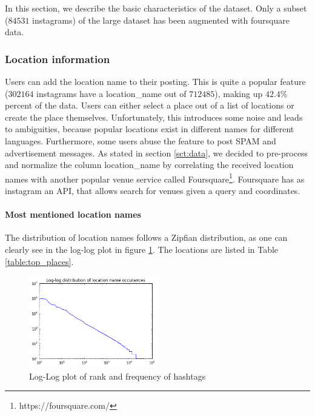 In this section, we describe the basic characteristics of the dataset. Only a subset ($84531$ instagrams) of the large dataset has been augmented with foursquare data.

\subsubsection{Location information}

Users can add the location name to their posting. This is quite a popular feature ($302164$ instagrams have a location\_name out of $712485$), making up $42.4\%$ percent of the data. Users can either select a place out of a list of locations or create the place themselves. Unfortunately, this introduces some noise and leads to ambiguities, because popular locations exist in different names for different languages. Furthermore, some users abuse the feature to post SPAM and advertisement messages. As stated in section \ref{sct:data}, we decided to pre-process and normalize the column location\_name by correlating the received location names with another popular venue service called Foursquare\footnote{https://foursquare.com/}. Foursquare has as instagram an API, that allows search for venues given a query and coordinates.

\paragraph{Most mentioned location names}

The distribution of location names follows a Zipfian distribution, as one can clearly see in the log-log plot in figure \ref{fig:location_name_log_log}. The locations are listed in Table \ref{table:top_places}.

\begin{figure}[h!]
  \centering
    \includegraphics[width=0.5\textwidth]{images/location_name_distribution_log_log}
  \caption{Log-Log plot of rank and frequency of hashtags}
  \label{fig:location_name_log_log}
\end{figure}

